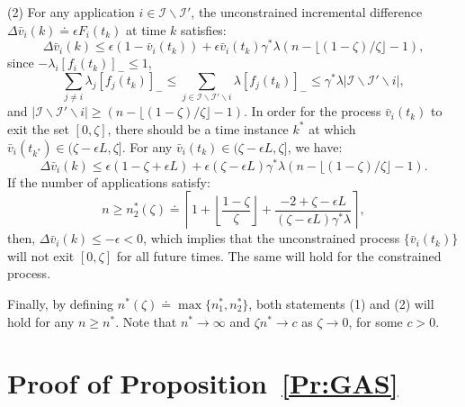 \documentclass[letter,11pt]{article}
\begin{document}
(2) For any application $i\in\mathcal{I}\backslash\mathcal{I}'$, the unconstrained incremental difference  $\Delta{{\bar{v}}_i(k)}{\doteq} \epsilon F_i(t_k)$ at time $k$ satisfies:
\begin{equation*}
\Delta{{\bar{v}}_i}(k) \leq \epsilon (1-{\bar{v}}_i(t_k)) + \epsilon{\bar{v}}_i(t_k)\gamma^*\lambda (n - \lfloor{(1-\zeta)/\zeta}\rfloor - 1),
\end{equation*}
since $-\lambda_i{[{f_i(t_k)}]_{-}} \leq 1$, $$\sum_{j\neq{i}}\lambda_j{[{f_j(t_k)}]_{-}}\leq\sum_{j\in\mathcal{I}\backslash\mathcal{I}'\backslash{i}}\lambda{[{f_j(t_k)}]_{-}} \leq \gamma^*\lambda {\left\vert {\mathcal{I}\backslash\mathcal{I}'\backslash{i}} \right\vert},$$ and ${\left\vert {\mathcal{I}\backslash\mathcal{I}'\backslash{i}} \right\vert} \geq (n-\lfloor{(1-\zeta)/\zeta}\rfloor -1)$.
In order for the process ${\bar{v}}_i(t_k)$ to exit the set $[0,\zeta]$, there should be a time instance $k^*$ at which ${\bar{v}}_i(t_{k^*}) \in (\zeta-\epsilon L,\zeta]$. For any ${\bar{v}}_i(t_k)\in (\zeta-\epsilon L,\zeta]$, we have:
\begin{equation*}
\Delta{{\bar{v}}_i(k)} \leq \epsilon(1-\zeta+\epsilon{L}) + \epsilon(\zeta-\epsilon{L})\gamma^*\lambda(n - \lfloor{(1-\zeta)/\zeta}\rfloor - 1).
\end{equation*}
If the number of applications satisfy: $$n\geq n_2^*(\zeta) {\doteq} \left\lceil{1+\left\lfloor{\frac{1-\zeta}{\zeta}}\right\rfloor + \frac{-2+\zeta-\epsilon{L}}{(\zeta-\epsilon{L})\gamma^*\lambda} }\right\rceil,$$ then, $\Delta{{\bar{v}}_i(k)}\leq -\epsilon < 0$, which implies that the unconstrained process $\{{\bar{v}}_i(t_k)\}$ will not exit $[0,\zeta]$ for all future times. The same will hold for the constrained process.

Finally, by defining $n^*(\zeta){\doteq}\max\{n_1^*,n_2^*\}$, both statements (1) and (2) will hold for any $n\geq n^*$. Note that $n^*\to\infty$ and $\zeta n^* \to c $ as $\zeta\to{0}$, for some $c>0$.

 
\section{Proof of Proposition~\ref{Pr:GAS}} \label{Ap:GAS}
\end{document}
